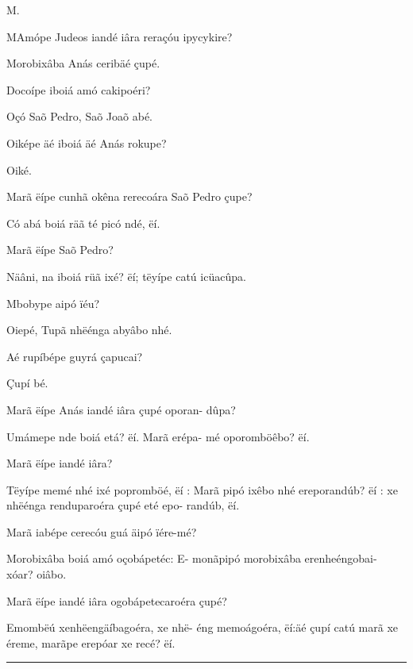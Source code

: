 \documentclass[openany,titlepage,12pt]{book}
\newcommand{\comecalista}[5]{
    \hspace*{-11.7pt}
    \begin{minipage}[t]{0.08\linewidth}
        \flushright #1\\#2
    \end{minipage}
    \hspace{0pt}
    \begin{minipage}[t]{0.94\linewidth}
        \lettrine
        [findent =2pt, nindent=0pt,  lines=2]
        {#3}{#4}#5
    \end{minipage}
    \vspace*{-3pt}
}
\begin{document}
\comecalista{M.}{}{M}{A}
    {mópe Judeos iandé iâra reraçóu
    \hspace*{2ex} ipycykire?
    }
\begin{altereven}
    \item Morobixâba Anás ceribäé çupé.
    \item Docoípe iboiá amó cakipoéri?
    \item Oçó Saõ Pedro, Saõ Joaõ abé.
    \item Oiképe äé iboiá äé Anás rokupe?
    \item Oiké.
    \item Marã ëípe cunhã okêna rerecoára Saõ\linebreak
    Pedro çupe?
    \item Có abá boiá räã té picó ndé, ëí. 
    \item Marã ëípe Saõ Pedro?
    \item Näâni, na iboiá rüã ixé? ëí; tëyípe catú
    icüacûpa.
    \item Mbobype aipó ïéu?
    \item Oiepé, Tupã nhëénga abyâbo nhé.
    \item Aé rupíbépe guyrá çapucai?
    \item Çupí bé.
    \item Marã ëípe Anás iandé iâra çupé oporan-
    dûpa?
    \item Umámepe nde boiá etá? ëí. Marã erépa-
    mé oporomböêbo? ëí.
    \item Marã ëípe iandé iâra?
    \item Tëyípe memé nhé ixé popromböé, ëí :
    Marã pipó ixêbo nhé ereporandúb? ëí :
    xe nhëénga renduparoéra çupé eté epo-\linebreak
    randúb, ëí. 
    \item Marã iabépe cerecóu guá äipó ïére-\linebreak mé?
    \item Morobixâba boiá amó oçobápetéc: E-\linebreak
    monãpipó morobixâba erenheéngobai-\linebreak
    xóar? oiâbo.
    \item Marã ëípe iandé iâra ogobápetecaroéra
    çupé?
    \item Emombëú xenhëengäíbagoéra, xe nhë-\pagebreak
    \linebreak éng memoágoéra, ëí:äé çupí catú marã xe
    éreme, marãpe erepóar xe recé? ëí.
\end{altereven}


\vspace{2pt}
\par\noindent\rule{\textwidth}{0.4pt}
\unskip\vspace*{2pt}
\end{document}
